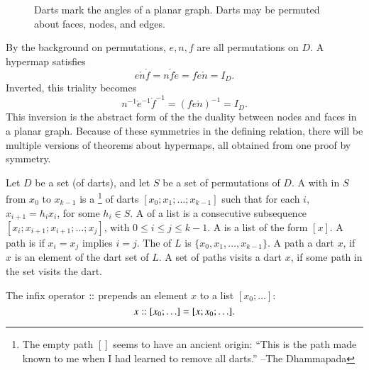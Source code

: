 \begin{figure}[htb]
\centering
{}
\caption{Darts mark the angles of a planar graph.  Darts may
be permuted about faces, nodes, and edges.}
\label{fig:hypermap_ex}
\end{figure}

By the background on permutations, $e,n,f$ are all permutations on $D$.
A hypermap satisfies 
\begin{equation}\label{eqn:triality}
e \ocirc n\ocirc f = n\ocirc f\ocirc e = f\ocirc e\ocirc n = I_D.
\end{equation}
Inverted, this triality becomes
\begin{displaymath}
n^{-1} \ocirc e^{-1} \ocirc f^{-1} = (f \ocirc e \ocirc n)^{-1} = I_D.
\end{displaymath}
This inversion is the abstract form of the the duality between nodes
and faces in a planar graph.  Because of these symmetries in the
defining relation, there will be multiple versions of theorems about
hypermaps, all obtained from one proof by symmetry.


\begin{definition} 
Let $D$ be a set (of darts), and let $S$ be a set of permutations of $D$.
A  with  in $S$
from $x_0$ to $x_{k-1}$ is a \footnote{The empty path $[]$ seems
to have an ancient origin: ``This is the path made known to me
when I had learned to remove all darts.'' --The Dhammapada} of
darts $[x_0;x_1;\ldots;x_{k-1}]$ such that for each $i$, $x_{i+1} = h_i x_i$,
for some $h_i \in S$.   A  of a list is a consecutive
subsequence  $[x_i;x_{i+1};x_{i+1};\ldots;x_j]$, with $0\le i\le j\le k-1$.
A  is a list of the form $[x]$.  A
path is  if $x_i=x_j$ implies $i=j$. 
The  of $L$ is $\{x_0,x_1,\ldots,x_{k-1}\}$.  A path 
a dart $x$, if $x$ is an element of the dart set of $L$.  A set of paths visits a
dart $x$, if some path in the set visits the dart.
\end{definition}

\begin{notation}[$\cooln$]
The infix operator $\cooln$ prepends an element $x$ to a list $[x_0;\ldots]$:
\begin{displaymath}
x:\hskip-0.02em:[x_0;\ldots] = [x;x_0;\ldots].
\end{displaymath}
\end{notation}
%
%


